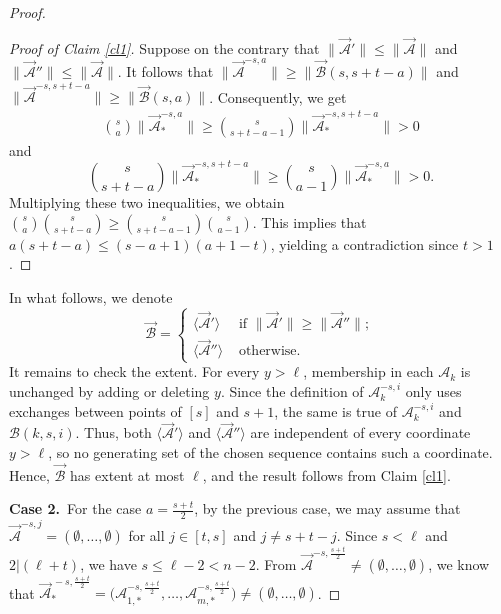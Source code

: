 \documentclass[11pt,a4paper]{article}
\begin{document}
\begin{proof}
\begin{proof}[Proof of Claim \ref{cl1}]
Suppose on the contrary that $\|\vec{\mathcal{A}}'\|\leq\|\vec{\mathcal{A}}\|$
and
$\|\vec{\mathcal{A}}''\|\leq\|\vec{\mathcal{A}}\|$.
It follows that $\|\vec{\mathcal{A}}^{-s,a}\|\geq  \|\vec{\mathcal{B}}(s,s+t-a)\|$ and $\|\vec{\mathcal{A}}^{-s,s+t-a}\|\geq  \|\vec{\mathcal{B}}(s,a)\|$.
 Consequently, we get 
\begin{align*}
 \binom{s}{a}\|\vec{\mathcal{A}}_*^{-s,a}\| 
 \geq  \binom{s}{s+t-a-1}\|\vec{\mathcal{A}}_*^{-s,s+t-a}\|>0
\end{align*}
and 
\[ \binom{s}{s+t-a}\|\vec{\mathcal{A}}_*^{-s,s+t-a}\| \geq  \binom{s}{a-1}\|\vec{\mathcal{A}}_*^{-s,a}\|>0. \]
Multiplying these two inequalities, we obtain $\binom{s}{a}\binom{s}{s+t-a}\geq  \binom{s}{s+t-a-1} \binom{s}{a-1}$. This implies that $a(s+t-a)\leq (s-a+1)(a+1-t)$, { yielding a contradiction since $t>1$.} 
\end{proof} 
In what follows, we denote  
$$
\vec{\mathcal{B}}= \begin{cases} \langle\vec{\mathcal{A}}' \rangle& \text { if } \|\vec{\mathcal{A}}'\|\geq \|\vec{\mathcal{A}}''\|;\\ 
\langle\vec{\mathcal{A}}''\rangle & \text { otherwise. }\end{cases}
$$
It remains to check the extent. For every $y>\ell$, membership in each
$\mathcal A_k$ is unchanged by adding or deleting $y$. Since the
definition of $\mathcal A_k^{-s,i}$ only uses exchanges between points
of $[s]$ and $s+1$, the same is true of
$\mathcal A_k^{-s,i}$ and $\mathcal B(k,s,i)$. Thus,  both $\langle\vec{\mathcal A}'\rangle$ and
$\langle\vec{\mathcal A}''\rangle$ are independent of every coordinate
$y>\ell$, so no generating set of the chosen sequence contains such a
coordinate. Hence, $\vec{\mathcal B}$ has extent at most $\ell$, and the
result follows from  Claim \ref{cl1}.
 


{\bf Case 2.}~For the case $a=\frac{s+t}{2}$, by the previous case, we may assume that 
$\vec{\mathcal{A}}^{-s,j} =(\emptyset,\ldots, \emptyset)$ for all $j\in [t,s]$ and $j\neq s+t-j$.
Since $s<\ell$ and $2|(\ell+t)$, we have $s\leq \ell-2< n-2$.
From $\vec{\mathcal{A}}^{-s,\frac{s+t}{2}} \neq(\emptyset,\ldots, \emptyset)$, we know that $\vec{\mathcal{A}}_*^{\,-s,\frac{s+t}{2}}=\Big(\mathcal{A}_{1,*}^{-s,\frac{s+t}{2}}, \ldots, \mathcal{A}_{m,*}^{-s,\frac{s+t}{2}}\Big) \neq(\emptyset,\ldots, \emptyset)$. 


\end{proof}
\end{document}
